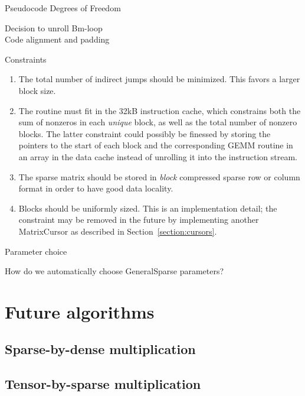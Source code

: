 Pseudocode
Degrees of Freedom

\begin{description}
  \item[Decision to unroll Bm-loop] 
  \item[Code alignment and padding]
\end{description}

Constraints

\begin{enumerate}

  \item The total number of indirect jumps should be minimized. This favors a larger block size.

  \item The routine must fit in the 32kB instruction cache, which constrains both the sum of nonzeros in each \emph{unique} block, as well as the total number of nonzero blocks. The latter constraint could possibly be finessed by storing the pointers to the start of each block and the corresponding GEMM routine in an array in the data cache instead of unrolling it into the instruction stream.

  \item The sparse matrix should be stored in \emph{block} compressed sparse row or column format in order to have good data locality.

  \item Blocks should be uniformly sized. This is an implementation detail; the constraint may be removed in the future by implementing another MatrixCursor as described in Section~\ref{section:cursors}.

\end{enumerate}

Parameter choice

How do we automatically choose GeneralSparse parameters?

\section{Future algorithms}

\subsection{Sparse-by-dense multiplication}



\subsection{Tensor-by-sparse multiplication}

